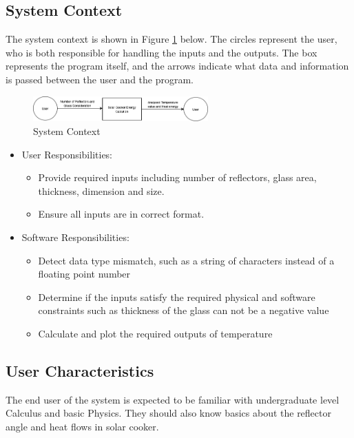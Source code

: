 \documentclass[12pt]{article}
\begin{document}
\subsection{System Context}

The system context is shown in Figure \ref{Fig_SystemContext} below. The circles represent the user, who is both responsible for handling the inputs and the outputs. The box represents the program itself, and the arrows indicate what data and information is passed between the user and the program. 

\begin{figure}[h!]
\begin{center}
\includegraphics[width=0.6\textwidth]{SystemContext}
\caption{System Context}
\label{Fig_SystemContext} 
\end{center}
\end{figure}

\begin{itemize}
\item User Responsibilities:
\begin{itemize}
\item Provide required inputs including number of reflectors, glass area, thickness, dimension and size. 
\item Ensure all inputs are in correct format. 
\end{itemize}

\item Software Responsibilities:
\begin{itemize}
\item Detect data type mismatch, such as a string of characters instead of a
  floating point number
\item Determine if the inputs satisfy the required physical and software constraints such as thickness of the glass can not be a negative value
\item Calculate and plot the required outputs of temperature
\end{itemize}
\end{itemize}

\subsection{User Characteristics} \label{SecUserCharacteristics}

The end user of the system is expected to be familiar with undergraduate level Calculus and basic Physics. They should also know basics about the reflector angle and heat flows in solar cooker.  
\end{document}
